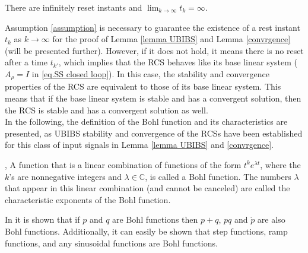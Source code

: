 \begin{assumption}
    \label{assumption}
    There are infinitely reset instants and $\lim_{k \to \infty} t_k=\infty$.\\
\end{assumption}

Assumption \ref{assumption} is necessary to guarantee the existence of a rest instant $t_k$ as $k\rightarrow \infty$ for the proof of Lemma \ref{lemma UBIBS} and Lemma \ref{convrgence} (will be presented further). However, if it does not hold, it means there is no reset after a time $t_{k'}$, which implies that the RCS behaves like its base linear system ($A_\rho=I$ in \eqref{eq.SS closed loop}). In this case, the stability and convergence properties of the RCS are equivalent to those of its base linear system. This means that if the base linear system is stable and has a convergent solution, then the RCS is stable and has a convergent solution as well.\\
In the following, the definition of the Bohl function and its characteristics are presented, as UBIBS stability and convergence of the RCSs have been established for this class of input signals in Lemma \ref{lemma UBIBS} and \ref{convrgence}.
\begin{definition}
    \label{def: bohl function}
    \cite[Definition 2.5]{Bohl_trentelman2002control}, A function that is a linear combination of functions of the form $t^k e^{\lambda t}$, where the $k$'s are nonnegative integers and $\lambda \in \mathbb{C}$, is called a Bohl function. The numbers $\lambda$ that appear in this linear combination (and cannot be canceled) are called the characteristic exponents of the Bohl function.\\
\end{definition}

\begin{remark}
    In \cite[Theorem 2.7]{Bohl_trentelman2002control} it is shown that if $p$ and $q$ are Bohl functions then $p+q$, $pq$ and $\dot{p}$ are also Bohl functions. Additionally, it can easily be shown that step functions, ramp functions, and any sinusoidal functions are Bohl functions.\\
\end{remark}


